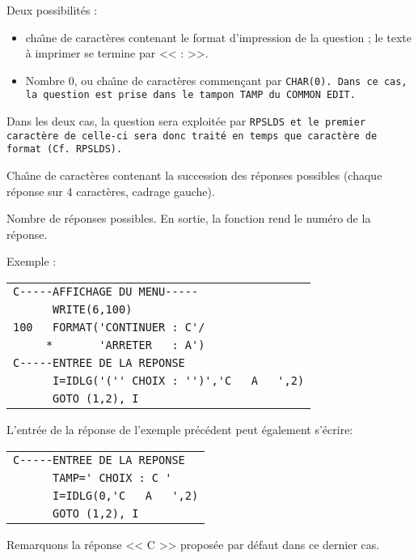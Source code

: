 \documentclass[a4paper,12pt,titlepage]{article}
\newcommand{\darg}[1]{\item[\tt #1\rm]}
\newenvironment{argdesc}{\begin{list}{-}{\leftmargin 8em \labelwidth 7em}}%
{\end{list}}
\begin{document}
\begin{argdesc} 

\darg{FORME :} Deux possibilit\'es :
    \begin{itemize}
          \item    cha\^{\i}ne de caract\`eres contenant le
		   format d'impression de la question ; le texte \`a
		   imprimer se termine par << : >>.  
          \item    Nombre 0, ou cha\^{\i}ne de caract\`eres commen\c{c}ant
                   par \tt CHAR(0)\rm. Dans ce cas, la question est prise
                   dans le tampon \tt TAMP\rm\ du \tt COMMON EDIT\rm.
    \end{itemize}

   Dans les deux cas, la question sera exploit\'ee par \tt RPSLDS\rm\ et le
   premier caract\`ere de celle-ci sera donc trait\'e en temps que
   caract\`ere de format (Cf. \tt RPSLDS\rm).
\darg{CTABREP :}
		   Cha\^{\i}ne de caract\`eres contenant la succession des
		   r\'eponses possibles (chaque r\'eponse sur 4
		   caract\`eres, cadrage gauche).  
\darg{NREP :} Nombre de r\'eponses possibles.  En sortie, la fonction rend le
		   num\'ero de la r\'eponse.  

       \pagebreak
                   Exemple :

                   \begin{center}\begin{tabular}{l}
                       \verb+C-----AFFICHAGE DU MENU-----+\\
                       \verb+      WRITE(6,100)+\\
                       \verb+100   FORMAT('CONTINUER : C'/+\\
                       \verb+     *       'ARRETER   : A')+\\
                       \verb+C-----ENTREE DE LA REPONSE+\\
                       \verb+      I=IDLG('('' CHOIX : '')','C   A   ',2)+\\
                       \verb+      GOTO (1,2), I+
                   \end{tabular}\end{center}

                    L'entr\'ee de la r\'eponse de l'exemple pr\'ec\'edent
                    peut \'egalement s'\'ecrire:
                   \begin{center}\begin{tabular}{l}
                       \verb+C-----ENTREE DE LA REPONSE+\\
                       \verb+      TAMP=' CHOIX : C '+\\
                       \verb+      I=IDLG(0,'C   A   ',2)+\\
                       \verb+      GOTO (1,2), I+
                   \end{tabular}\end{center}

                    Remarquons la r\'eponse << C >> propos\'ee par d\'efaut
                    dans ce dernier cas.

\end{argdesc}              
\end{document}
